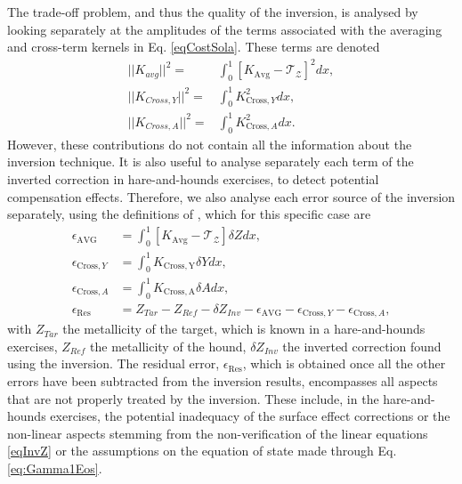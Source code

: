 \documentclass[a4paper,fleqn,usenatbib]{mnras}
\begin{document}
The trade-off problem, and thus the quality of the inversion, is analysed by looking separately at the amplitudes of the terms associated with the averaging and cross-term kernels in Eq. \ref{eqCostSola}. These terms are denoted
\begin{align}
\vert \vert K_{avg} \vert \vert^{2}= & \int_{0}^{1}\left[ K_{\mathrm{Avg}}-\mathcal{T}_{\mathcal{Z}}\right]^{2}dx, \label{EqNormAVG}\\
\vert \vert K_{Cross,Y}\vert \vert^{2} = & \int_{0}^{1}K^{2}_{\mathrm{Cross},Y}dx, \label{EqNormCrossY}\\
\vert \vert K_{Cross,A}\vert \vert^{2}= & \int_{0}^{1}K^{2}_{\mathrm{Cross},A}dx. \label{EqNormCrossA}
\end{align}
However, these contributions do not contain all the information about the inversion technique. It is also useful to analyse separately each term of the inverted correction in hare-and-hounds exercises, to detect potential compensation effects. Therefore, we also analyse each error source of the inversion separately, using the definitions of \citet{Buldgentu}, which for this specific case are
\begin{align}
\epsilon_{\mathrm{AVG}}&=\int_{0}^{1}\left[ K_{\mathrm{Avg}}-\mathcal{T}_{\mathcal{Z}} \right] \delta Z dx, \label{EqEpsAVG} \\
\epsilon_{\mathrm{Cross},Y}&=\int_{0}^{1} K_{\mathrm{Cross,Y}} \delta Y dx, \label{EqEpsCrossY}\\
\epsilon_{\mathrm{Cross},A}&=\int_{0}^{1} K_{\mathrm{Cross,A}} \delta A dx, \label{EqEpsCrossA}\\
\epsilon_{\mathrm{Res}}&=Z_{Tar}-Z_{Ref} -\delta Z_{Inv}- \epsilon_{\mathrm{AVG}} - \epsilon_{\mathrm{Cross},Y} - \epsilon_{\mathrm{Cross},A} \label{EqEpsRes},
\end{align}
with $Z_{Tar}$ the metallicity of the target, which is known in a hare-and-hounds exercises, $Z_{Ref}$ the metallicity of the hound, $\delta Z_{Inv}$ the inverted correction found using the inversion. The residual error, $\epsilon_{\mathrm{Res}}$, which is obtained once all the other errors have been subtracted from the inversion results, encompasses all aspects that are not properly treated by the inversion. These include, in the hare-and-hounds exercises, the potential inadequacy of the surface effect corrections or the non-linear aspects stemming from the non-verification of the linear equations \ref{eqInvZ} or the assumptions on the equation of state made through Eq. \ref{eq:Gamma1Eos}.
\end{document}
